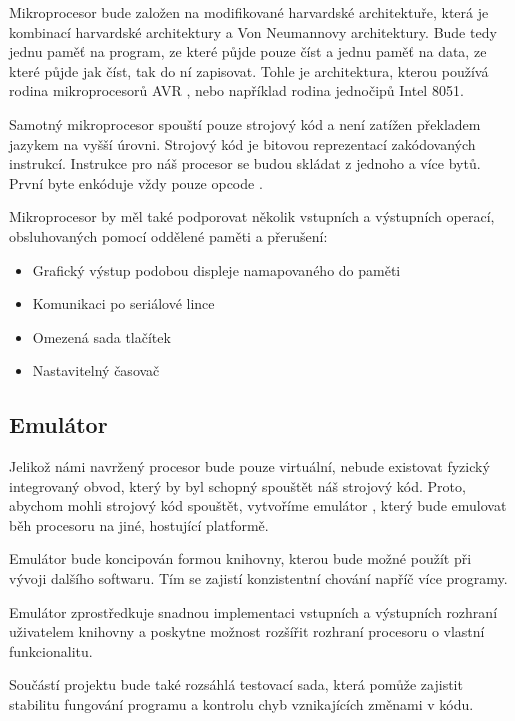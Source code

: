 Mikroprocesor bude založen na modifikované harvardské architektuře, která je kombinací harvardské architektury a Von Neumannovy architektury.  Bude tedy jednu paměť na program, ze které půjde pouze číst a jednu paměť na data, ze které půjde jak číst, tak do ní zapisovat. Tohle je architektura, kterou používá rodina mikroprocesorů AVR , nebo například rodina jednočipů Intel 8051. 

Samotný mikroprocesor spouští pouze strojový kód a není zatížen překladem jazykem na vyšší úrovni. Strojový kód je bitovou reprezentací zakódovaných instrukcí. Instrukce pro náš procesor se budou skládat z jednoho a více bytů. První byte enkóduje vždy pouze opcode . 

Mikroprocesor by měl také podporovat několik vstupních a výstupních operací, obsluhovaných pomocí oddělené paměti a přerušení:

\begin{itemize}
	\item Grafický výstup podobou displeje namapovaného do paměti
	\item Komunikaci po seriálové lince
	\item Omezená sada tlačítek
	\item Nastavitelný časovač
\end{itemize}

\subsection{Emulátor}

Jelikož námi navržený procesor bude pouze virtuální, nebude existovat fyzický integrovaný obvod, který by byl schopný spouštět náš strojový kód. Proto, abychom mohli strojový kód spouštět, vytvoříme emulátor , který bude emulovat běh procesoru na jiné, hostující platformě.

Emulátor bude koncipován formou knihovny, kterou bude možné použít při vývoji dalšího softwaru. Tím se zajistí konzistentní chování napříč více programy.

Emulátor zprostředkuje snadnou implementaci vstupních a výstupních rozhraní uživatelem knihovny a poskytne možnost rozšířit rozhraní procesoru o vlastní funkcionalitu.

Součástí projektu bude také rozsáhlá testovací sada, která pomůže zajistit stabilitu fungování programu a kontrolu chyb vznikajících změnami v kódu. 

